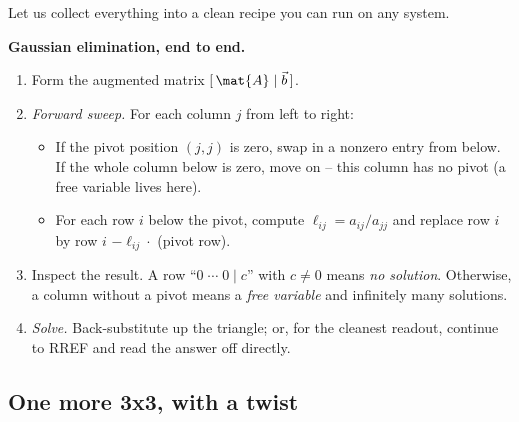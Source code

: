 Let us collect everything into a clean recipe you can run on any system.

\begin{focusbox}
\textbf{Gaussian elimination, end to end.}
\begin{enumerate}
  \item Form the augmented matrix $[\,\mat{A}\mid\vec{b}\,]$.
  \item \emph{Forward sweep.} For each column $j$ from left to right:
  \begin{itemize}
    \item If the pivot position $(j,j)$ is zero, swap in a nonzero entry from
    below. If the whole column below is zero, move on -- this column has no
    pivot (a free variable lives here).
    \item For each row $i$ below the pivot, compute $\ell_{ij}=a_{ij}/a_{jj}$ and
    replace row $i$ by row $i$ $-\ell_{ij}\cdot$ (pivot row).
  \end{itemize}
  \item Inspect the result. A row ``$0\;\cdots\;0\mid c$'' with $c\neq 0$ means
  \emph{no solution}. Otherwise, a column without a pivot means a \emph{free
  variable} and infinitely many solutions.
  \item \emph{Solve.} Back-substitute up the triangle; or, for the cleanest
  readout, continue to RREF and read the answer off directly.
\end{enumerate}
\end{focusbox}

\subsection{One more 3x3, with a twist}

